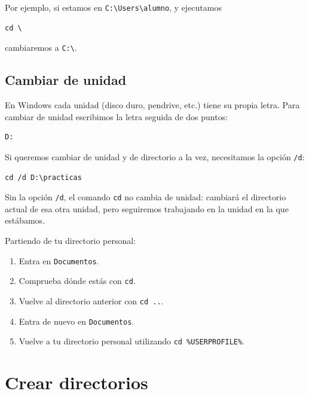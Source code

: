 \documentclass[11pt,a4paper]{article}
\begin{document}
\noindent Por ejemplo, si estamos en \verb|C:\Users\alumno|, y ejecutamos
\begin{lstlisting}
cd \
\end{lstlisting}
cambiaremos a \verb|C:\|.

\subsection{Cambiar de unidad}

En Windows cada unidad (disco duro, pendrive, etc.) tiene su propia
letra. Para cambiar de unidad escribimos la letra seguida de dos
puntos:

\begin{lstlisting}
D:
\end{lstlisting}

\noindent Si queremos cambiar de unidad y de directorio a la vez,
necesitamos la opción \texttt{/d}:

\begin{lstlisting}
cd /d D:\practicas
\end{lstlisting}

\begin{peligro}
Sin la opción \texttt{/d}, el comando \texttt{cd} no cambia de unidad:
cambiará el directorio actual de esa otra unidad, pero seguiremos
trabajando en la unidad en la que estábamos.
\end{peligro}

\begin{ejercicio}
Partiendo de tu directorio personal:

\begin{enumerate}
    \item Entra en \texttt{Documentos}.
    \item Comprueba dónde estás con \texttt{cd}.
    \item Vuelve al directorio anterior con \texttt{cd ..}.
    \item Entra de nuevo en \texttt{Documentos}.
    \item Vuelve a tu directorio personal utilizando \verb|cd %USERPROFILE%|.
\end{enumerate}
\end{ejercicio}

\section{Crear directorios}
\end{document}
